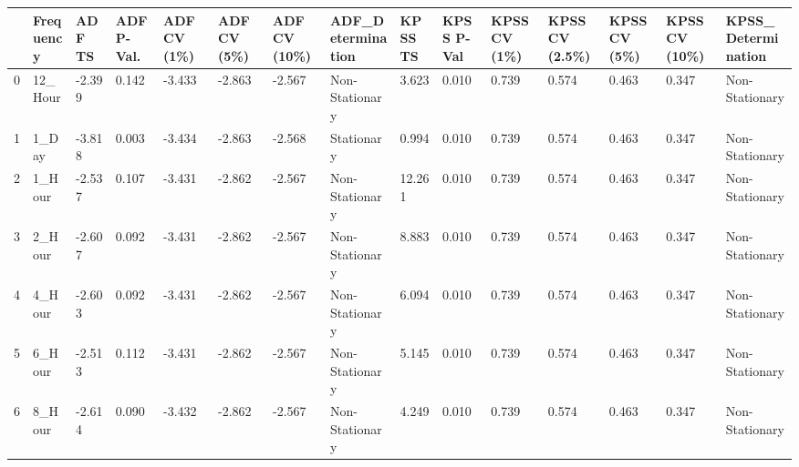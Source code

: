 \begin{tabular}{lllllllllllllll}
\toprule
 & Frequency & ADF TS & ADF P-Val. & ADF CV (1\%) & ADF CV (5\%) & ADF CV (10\%) & ADF_Determination & KPSS TS & KPSS P-Val & KPSS CV (1\%) & KPSS CV (2.5\%) & KPSS CV (5\%) & KPSS CV (10\%) & KPSS_Determination \\
\midrule
0 & 12_Hour & -2.399 & 0.142 & -3.433 & -2.863 & -2.567 & Non-Stationary & 3.623 & 0.010 & 0.739 & 0.574 & 0.463 & 0.347 & Non-Stationary \\
1 & 1_Day & -3.818 & 0.003 & -3.434 & -2.863 & -2.568 & Stationary & 0.994 & 0.010 & 0.739 & 0.574 & 0.463 & 0.347 & Non-Stationary \\
2 & 1_Hour & -2.537 & 0.107 & -3.431 & -2.862 & -2.567 & Non-Stationary & 12.261 & 0.010 & 0.739 & 0.574 & 0.463 & 0.347 & Non-Stationary \\
3 & 2_Hour & -2.607 & 0.092 & -3.431 & -2.862 & -2.567 & Non-Stationary & 8.883 & 0.010 & 0.739 & 0.574 & 0.463 & 0.347 & Non-Stationary \\
4 & 4_Hour & -2.603 & 0.092 & -3.431 & -2.862 & -2.567 & Non-Stationary & 6.094 & 0.010 & 0.739 & 0.574 & 0.463 & 0.347 & Non-Stationary \\
5 & 6_Hour & -2.513 & 0.112 & -3.431 & -2.862 & -2.567 & Non-Stationary & 5.145 & 0.010 & 0.739 & 0.574 & 0.463 & 0.347 & Non-Stationary \\
6 & 8_Hour & -2.614 & 0.090 & -3.432 & -2.862 & -2.567 & Non-Stationary & 4.249 & 0.010 & 0.739 & 0.574 & 0.463 & 0.347 & Non-Stationary \\
\bottomrule
\end{tabular}
